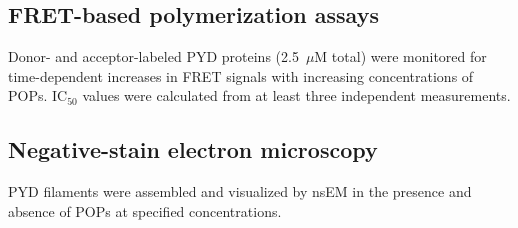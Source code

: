 \documentclass[11pt]{article}
\begin{document}
\subsection{FRET-based polymerization assays}
Donor- and acceptor-labeled PYD proteins (2.5~$\mu$M total) were monitored for time-dependent increases in FRET signals with increasing concentrations of POPs. IC$_{50}$ values were calculated from at least three independent measurements.

\subsection{Negative-stain electron microscopy}
PYD filaments were assembled and visualized by nsEM in the presence and absence of POPs at specified concentrations.



\end{document}
